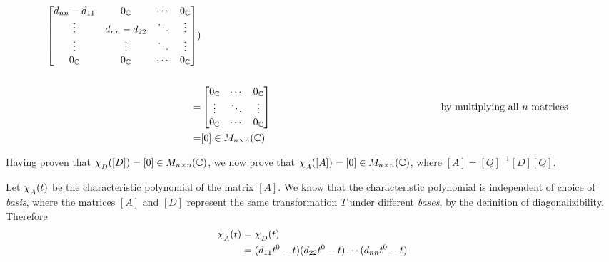\documentclass[12pt, letterpaper]{article}
\newcommand{\C}{\mathbb{C}}
\begin{document}
\begin{align*}
\begin{bmatrix}
		d_{nn} - d_{11} & 0_\C & \cdots & 0_\C \\
		\vdots & d_{nn} - d_{22} & \ddots & \vdots \\
		\vdots & \vdots & \ddots & \vdots \\		
		0_\C & 0_\C & \cdots & 0_\C \\
		\end{bmatrix}
		) \\ \\
	=&
		\begin{bmatrix}
		0_\C & \cdots & 0_\C \\
		\vdots & \ddots & \vdots \\
		0_\C & \cdots & 0_\C \\
		\end{bmatrix} \hspace{16.9em} \text{by multiplying all $n$ matrices} \\
	=& [0] \in M_{n \times n}(\C)
\end{align*}

Having proven that $\chi_{\raisebox{-.5ex}{$\scriptstyle D$}}([D]) = [0] \in M_{n \times n}(\C)$, we now prove that $\chi_{\raisebox{-.5ex}{$\scriptstyle A$}}([A]) = [0] \in M_{n \times n}(\C)$, where $[A] = [Q]^{-1}[D][Q]$.

Let $\chi_{\raisebox{-.5ex}{$\scriptstyle A$}}(t)$ be the characteristic polynomial of the matrix $[A]$. We know that the characteristic polynomial is independent of choice of \textit{basis}, where the matrices $[A]$ and $[D]$ represent the same transformation $T$ under different \textit{bases}, by the definition of diagonalizibility. Therefore
\begin{align*}
\chi_{\raisebox{-.5ex}{$\scriptstyle A$}}(t) 
&= \chi_{\raisebox{-.5ex}{$\scriptstyle D$}}(t) \\
&= (d_{11}t^0 - t)(d_{22}t^0 - t) \cdots (d_{nn}t^0 - t)	
\end{align*}
\end{document}
